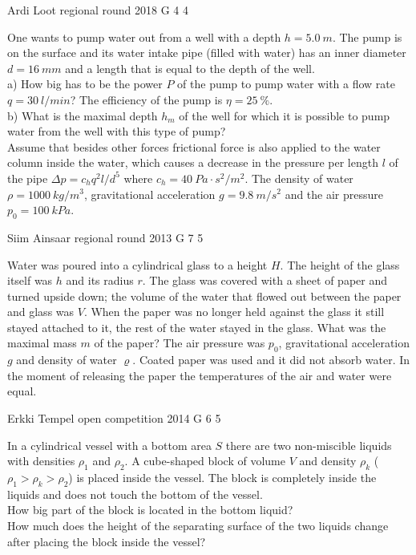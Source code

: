 \documentclass[11pt]{article}
\begin{document}
{Ardi Loot} %
{regional round} %
{2018} %
{G 4} %
{4} %
{

\ifEngStatement
One wants to pump water out from a well with a depth $h=\SI{5.0}{m}$. The pump is on the surface and its water intake pipe (filled with water) has an inner diameter $d=\SI{16}{mm}$ and a length that is equal to the depth of the well.\\
a) How big has to be the power $P$ of the pump to pump water with a flow rate $q=\SI{30}{l/min}$? The efficiency of the pump is $\eta=\SI{25}{\percent}$.\\
b) What is the maximal depth $h_{m}$ of the well for which it is possible to pump water from the well with this type of pump?\\
Assume that besides other forces frictional force is also applied to the water column inside the water, which causes a decrease in the pressure per length $l$ of the pipe $\Delta p=c_{h}q^{2}l/d^{5}$ where $c_{h}=\SI{40}{Pa\cdot s^{2}/m^{2}}$. The density of water $\rho=\SI{1000}{kg/m^{3}}$, gravitational acceleration $g=\SI{9.8}{m/s^{2}}$ and the air pressure $p_{0}=\SI{100}{kPa}$.
\fi
}

{Siim Ainsaar} %
{regional round} %
{2013} %
{G 7} %
{5} %
{

\ifEngStatement
Water was poured into a cylindrical glass to a height $H$. The height of the glass itself was $h$ and its radius $r$. The glass was covered with a sheet of paper and turned upside down; the volume of the water that flowed out between the paper and glass was $V$. When the paper was no longer held against the glass it still stayed attached to it, the rest of the water stayed in the glass. What was the maximal mass $m$ of the paper? The air pressure was $p_0$, gravitational acceleration $g$ and density of water $\varrho$. Coated paper was used and it did not absorb water. In the moment of releasing the paper the temperatures of the air and water were equal.
\fi
}

{Erkki Tempel} %
{open competition} %
{2014} %
{G 6} %
{5} %
{

\ifEngStatement
In a cylindrical vessel with a bottom area $S$ there are two non-miscible liquids with densities $\rho_1$ and $\rho_2$. A cube-shaped block of volume $V$ and density $\rho_k$ ($\rho_1>\rho_k>\rho_2$) is placed inside the vessel. The block is completely inside the liquids and does not touch the bottom of the vessel.\\
\osa How big part of the block is located in the bottom liquid?\\
\osa How much does the height of the separating surface of the two liquids change after placing the block inside the vessel?
\fi
}
\end{document}

